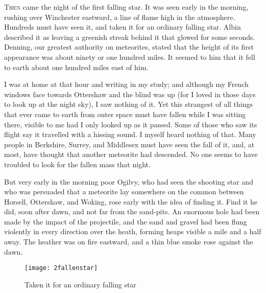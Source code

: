 


\lettrine[lines=4,findent=2pt]{T}{hen} came the night of the first falling star. It was seen early in the morning, rushing over Winchester eastward, a line of flame high in the atmosphere. Hundreds must have seen it, and taken it for an ordinary falling star. Albin described it as leaving a greenish streak behind it that glowed for some seconds. Denning, our greatest authority on meteorites, stated that the height of its first appearance was about ninety or one hundred miles. It seemed to him that it fell to earth about one hundred miles east of him.

I was at home at that hour and writing in my study; and although my French windows face towards Ottershaw and the blind was up (for I loved in those days to look up at the night sky), I saw nothing of it. Yet this strangest of all things that ever came to earth from outer space must have fallen while I was sitting there, visible to me had I only looked up as it passed. Some of those who saw its flight say it travelled with a hissing sound. I myself heard nothing of that. Many people in Berkshire, Surrey, and Middlesex must have seen the fall of it, and, at most, have thought that another meteorite had descended. No one seems to have troubled to look for the fallen mass that night.

But very early in the morning poor Ogilvy, who had seen the shooting star and who was persuaded that a meteorite lay somewhere on the common between Horsell, Ottershaw, and Woking, rose early with the idea of finding it. Find it he did, soon after dawn, and not far from the sand-pits. An enormous hole had been made by the impact of the projectile, and the sand and gravel had been flung violently in every direction over the heath, forming heaps visible a mile and a half away. The heather was on fire eastward, and a thin blue smoke rose against the dawn.


\begin{sidewaysfigure}
\texttt{[image: 2fallenstar]}%
\caption{Taken it for an ordinary falling star}
\end{sidewaysfigure}

